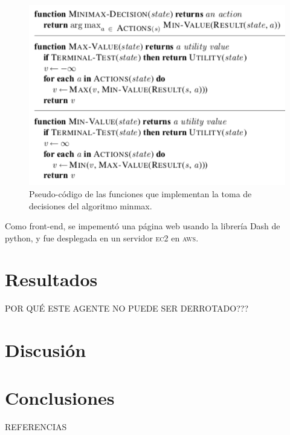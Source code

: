 \documentclass[11pt]{article}
\begin{document}
\begin{figure}
\begin{center}
\includegraphics[scale=.5]{imagenes/busqueda-minmax}
\end{center}
\caption{Pseudo-código de las funciones que implementan la toma de decisiones del algoritmo minmax.}\label{fig:minmax}
\end{figure}

Como front-end, se impementó una página web usando la librería Dash de python, y fue desplegada en un servidor \textsc{ec2} en \textsc{aws}.

\section{Resultados}


POR QUÉ ESTE AGENTE NO PUEDE SER DERROTADO???

\section{Discusión}

\section{Conclusiones}

REFERENCIAS
\end{document}
